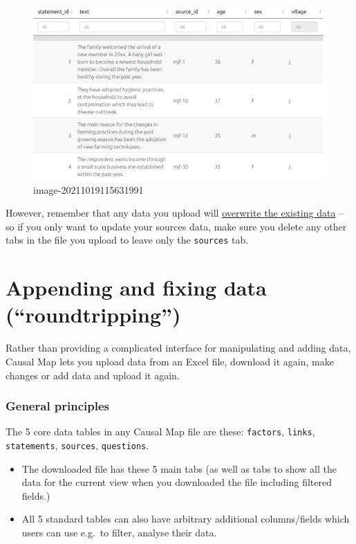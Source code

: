 \documentclass[
]{book}
\providecommand{\tightlist}{%
  \setlength{\itemsep}{0pt}\setlength{\parskip}{0pt}}
\begin{document}
\begin{figure}
\centering
\includegraphics[width=6.77083in,height=\textheight]{_assets/image-20211019115631991.png}
\caption{image-20211019115631991}
\end{figure}

However, remember that any data you upload will \protect\hyperlink{import-general-principles}{overwrite the existing data} -- so if you only want to update your sources data, make sure you delete any other tabs in the file you upload to leave only the \texttt{sources} tab.

\hypertarget{xroundtripping}{%
\chapter{Appending and fixing data (``roundtripping'')}\label{xroundtripping}}

Rather than providing a complicated interface for manipulating and adding data, Causal Map lets you upload data from an Excel file, download it again, make changes or add data and upload it again.

\hypertarget{import-general-principles}{%
\subsection{General principles}\label{import-general-principles}}

The 5 core data tables in any Causal Map file are these: \texttt{factors}, \texttt{links}, \texttt{statements}, \texttt{sources}, \texttt{questions}.

\begin{itemize}
\tightlist
\item
  The downloaded file has these 5 main tabs (as well as tabs to show all the data for the current view when you downloaded the file including filtered fields.)
\item
  All 5 standard tables can also have arbitrary additional columns/fields which users can use e.g.~to filter, analyse their data.
\end{itemize}
\end{document}
